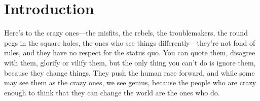\documentclass[10pt]{article} %
\def\mydoctitle{Mesh Communication for Checksums}
\def\myshortname{Terhorst, J.}
\begin{document}

\begin{comment}

\addcontentsline{toc}{section}{Acknowledgments}
\section*{Acknowledgments}

Thank you.

\newpage


\setcounter{page}{1}
\pagenumbering{arabic}

\end{comment}








\section{Introduction}

Here's to the crazy ones---the misfits, the rebels, the troublemakers, the round pegs in the square holes, the ones who see things differently---they're not fond of rules, and they have no respect for the status quo. You can quote them, disagree with them, glorify or vilify them, but the only thing you can't do is ignore them, because they change things. They push the human race forward, and while some may see them as the crazy ones, we see genius, because the people who are crazy enough to think that they can change the world are the ones who do.
\end{document}
